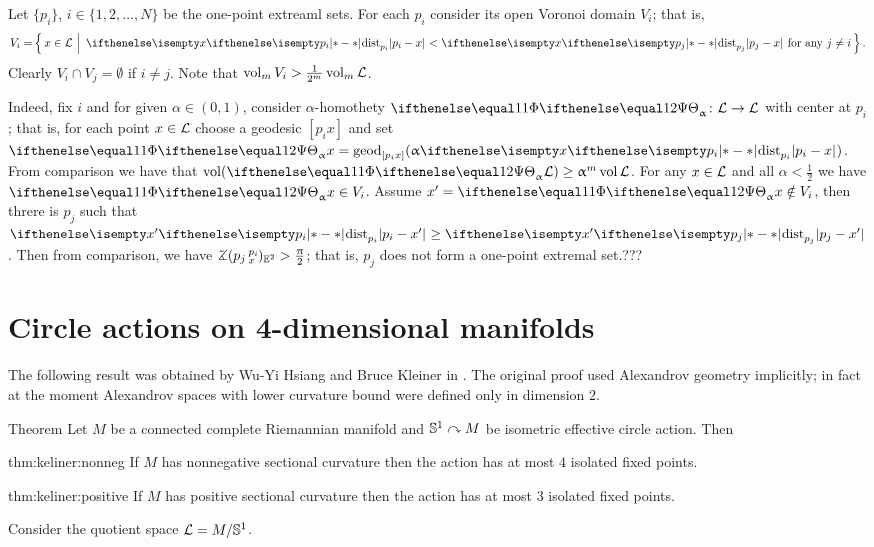 Let $\{p_i\}$, $i\in\{1,2,\dots,N\}$ be the one-point extreaml sets.
For each $p_i$ consider its open Voronoi domain $V_i$; that is, 
\[V_i=\set{x\in \spc{L}}{\dist{p_i}{x}{}<\dist{p_j}{x}{}\ \t{for any}\ j\not=i}.\]
Clearly $V_i\cap V_j=\emptyset$ if $i\not=j$.
Note that $\mathop{\rm vol}\nolimits_mV_i>\frac{1}{2^m}\mathop{\rm vol}\nolimits_m \mathcal{L}$.

Indeed, fix $i$ and for given $\alpha\in(0,1)$, consider $\alpha$-homothety $\map_\alpha\:\spc{L}\to \spc{L}$ with center at $p_i$; 
that is, for each point $x\in \spc{L}$ choose a geodesic $[p_ix]$ and set
$\map_\alpha x=\geod_{[p_ix]}(\alpha\dist{p_i}{x}{})$.
From comparison we have that $\vol(\map_\alpha \spc{L})\ge\alpha^m\vol \spc{L}$.
For any $x\in \spc{L}$ and all $\alpha<\tfrac{1}{2}$ we have $\map_\alpha x\in V_i$.
Assume $x'=\map_\alpha x\notin V_i$,
then threre is $p_j$ such that $\dist{p_i}{x'}{}\ge\dist{p_j}{x'}{}$.
Then from comparison, we have $\angk{p_j}{p_i}{x}_{\EE^2}>\tfrac\pi2$;
that is, $p_j$ does not form a one-point extremal set.???
\qeds

\section{Circle actions on 4-dimensional manifolds}



The following result was obtained by Wu-Yi Hsiang and Bruce Kleiner in \cite{hsiang-kleiner}.
The original proof used Alexandrov geometry implicitly;
in fact at the moment 
Alexandrov spaces with lower curvature bound were defined only in dimension $2$.

\begin{thm}{Theorem}\label{thm:keliner}
Let $M$ be a connected complete Riemannian manifold 
and $\mathbb{S}^1\curvearrowright M$ be isometric effective circle action.
Then
\begin{subthm}{thm:keliner:nonneg}
If $M$ has nonnegative sectional curvature then the action has at most $4$ isolated fixed points.
\end{subthm}

\begin{subthm}{thm:keliner:positive}
If $M$ has positive sectional curvature then the action has at most $3$ isolated fixed points.
\end{subthm}

\end{thm}

Consider the quotient space $\mathcal{L}=M/\mathbb{S}^1$.

